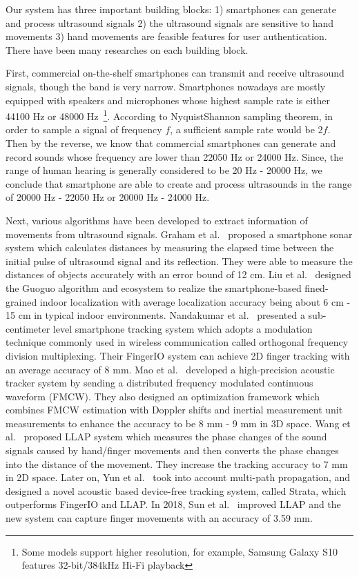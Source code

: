 Our {\uu} system has three important building blocks: 1) smartphones can generate and process ultrasound signals 2) the ultrasound signals are sensitive to hand movements 3) hand movements are feasible features for user authentication. There have been many researches on each  building block.

First, commercial on-the-shelf smartphones can transmit and receive ultrasound signals, though the band is very narrow. Smartphones nowadays are mostly equipped with speakers and microphones whose highest sample rate is either 44100 Hz or 48000 Hz~\footnote{Some models support higher resolution, for example, Samsung Galaxy S10 features 32-bit/384kHz Hi-Fi playback}. According to NyquistShannon sampling theorem, in order to sample a signal of frequency $f$, a sufficient sample rate would be $2f$. Then by the reverse, we know that commercial smartphones can generate and record sounds whose frequency are lower than 22050 Hz or 24000 Hz. Since, the range of human hearing is generally considered to be 20 Hz - 20000 Hz, we conclude that smartphone are able to create and process ultrasounds in the range of 20000 Hz - 22050 Hz or 20000 Hz - 24000 Hz.

Next, various algorithms have been developed to extract information of movements from ultrasound signals.  Graham et al.~\cite{graham2015software} proposed a smartphone sonar system which calculates distances by measuring the elapsed time between the initial pulse of ultrasound signal and its reflection. They were able to measure the distances of objects accurately with an error bound of 12 cm. Liu et al.~\cite{liu2015guoguo} designed the Guoguo algorithm and ecosystem to realize the smartphone-based fined-grained indoor localization with average localization accuracy being about 6 cm - 15 cm in typical indoor environments. Nandakumar et al.~\cite{nandakumar2016fingerio} presented a sub-centimeter level smartphone tracking system which adopts a modulation technique commonly used in wireless communication called orthogonal frequency division multiplexing. Their FingerIO system can achieve 2D finger tracking with an average accuracy of 8 mm. Mao et al.~\cite{mao2016cat} developed a high-precision acoustic tracker system by sending a distributed frequency
modulated continuous waveform (FMCW). They also designed an optimization framework which combines FMCW estimation with Doppler shifts and inertial measurement unit measurements to enhance the accuracy to be 8 mm - 9 mm in 3D space. Wang et al.~\cite{wang2016device} proposed LLAP system which measures the phase changes of the sound signals caused by hand/finger movements and then converts the phase changes into the distance of the movement. They increase the tracking accuracy to 7 mm in 2D space. Later on, Yun et al.~\cite{yun2017strata}  took into account multi-path propagation, and designed a novel acoustic based device-free tracking system, called Strata, which outperforms FingerIO and LLAP. In 2018, Sun et al.~\cite{sun2018vskin} improved LLAP and  the new system can capture finger movements with an accuracy of 3.59 mm. 

